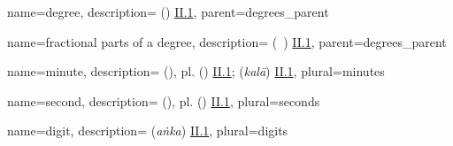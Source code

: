 {
        name={degree},
        description={ (\daraj) \hyperlink{Pii1}{II.1}},
        parent={degrees_parent}
}

{
        name={fractional parts of a degree},
        description={ (\ajza\idafaconsonant\ \daraj) \hyperlink{Pii1}{II.1}},
        parent={degrees_parent}
}

{
        name={minute},
        description={ (\daqiqa), pl.\thinspace {} (\daqaiq) \hyperlink{Pii1}{II.1};  (\textit{kalā}) \hyperlink{Sii1}{II.1}},
        plural={minutes}
}

{
        name={second},
        description={ (\thaniya), pl.\thinspace {} (\thawani) \hyperlink{Pii1}{II.1}},
        plural={seconds}
}


{
        name={digit},
        description={ (\textit{aṅka}) \hyperlink{Sii1}{II.1}},
        plural={digits}
}